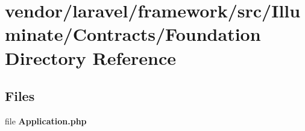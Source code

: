 \section{vendor/laravel/framework/src/\+Illuminate/\+Contracts/\+Foundation Directory Reference}
\label{dir_ad50d9533b0e1af5623c3d29e4706905}
\subsection*{Files}
\begin{DoxyCompactItemize}
\item 
file {\bf Application.\+php}
\end{DoxyCompactItemize}
